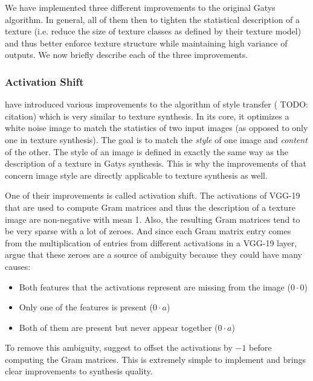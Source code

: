 We have implemented three different improvements to the original Gatys algorithm. In general, all of them then to tighten the statistical description of a texture (i.e. reduce the size of texture classes as defined by their texture model) and thus better enforce texture structure while maintaining high variance of outputs. We now briefly describe each of the three improvements.

\subsubsection{Activation Shift}
\label{section:methods-texture_model-improvements-activation_shift}

\citet{Novak2016} have introduced various improvements to the algorithm of style transfer ({\color{red} TODO: citation}) which is very similar to texture synthesis. In its core, it optimizes a white noise image to match the statistics of two input images (as opposed to only one in texture synthesis). The goal is to match the \textit{style} of one image and \textit{content} of the other. The style of an image is defined in exactly the same way as the description of a texture in Gatys synthesis. This is why the improvements of \citet{Novak2016} that concern image style are directly applicable to texture synthesis as well.

One of their improvements is called activation shift. The activations of VGG-19 that are used to compute Gram matrices and thus the description of a texture image are non-negative with mean 1. Also, the resulting Gram matrices tend to be very sparse with a lot of zeroes. And since each Gram matrix entry comes from the multiplication of entries from different activations in a VGG-19 layer, \citet{Novak2016} argue that these zeroes are a source of ambiguity because they could have many causes:

\begin{itemize}
    \item Both features that the activations represent are missing from the image (\(0 \cdot 0\))
    \item Only one of the features is present (\(0 \cdot a\))
    \item Both of them are present but never appear together (\(0 \cdot a\))
\end{itemize}

To remove this ambiguity, \citet{Novak2016} suggest to offset the activations by \(-1\) before computing the Gram matrices. This is extremely simple to implement and brings clear improvements to synthesis quality.

